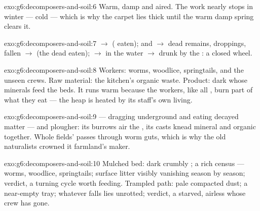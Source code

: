 \begin{solution}{exo:g6:decomposers-and-soil:6}
Warm, damp and aired. The work nearly stops in winter ---
cold --- which is why the carpet lies thick until the warm
damp spring clears it.
\end{solution}

\begin{solution}{exo:g6:decomposers-and-soil:7}
 $\rightarrow$  ( eaten); 
and  $\rightarrow$ dead remains, droppings, fallen
 $\rightarrow$  (the dead eaten);
 $\rightarrow$  in the  water
$\rightarrow$ drunk by the : a closed wheel.
\end{solution}

\begin{solution}{exo:g6:decomposers-and-soil:8}
Workers: worms, woodlice, springtails,  and the unseen
crews. Raw material: the kitchen's organic waste. Product:
dark  whose minerals feed the beds. It runs warm
because the workers, like all , burn part of what
they eat --- the heap is heated by its staff's own living.
\end{solution}

\begin{solution}{exo:g6:decomposers-and-soil:9}
 --- dragging  underground and eating
decayed matter --- and plougher: its burrows air the ,
its casts knead mineral and organic together. Whole fields'
 passes through worm guts, which is why the old
naturalists crowned it farmland's maker.
\end{solution}

\begin{solution}{exo:g6:decomposers-and-soil:10}
Mulched bed: dark crumbly ; a rich census --- worms,
woodlice, springtails; surface litter visibly vanishing
season by season; verdict, a turning cycle worth feeding.
Trampled path: pale compacted dust; a near-empty tray;
whatever falls lies unrotted; verdict, a starved, airless
 whose crew has gone.
\end{solution}

